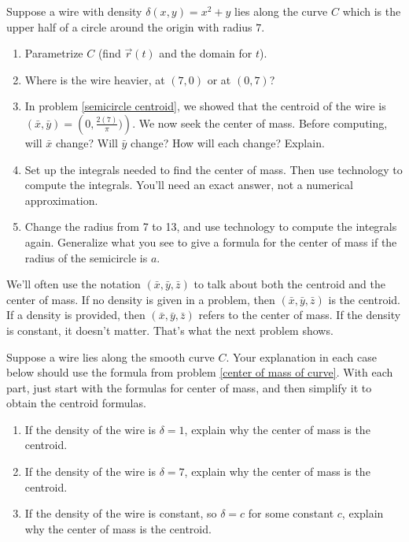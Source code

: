 \begin{problem}
%
Suppose a wire with density $\delta(x,y)=x^2+y$ lies along the curve $C$ which is the upper half of a circle around the origin with radius $7$.
\begin{enumerate}
\item Parametrize $C$ (find $\vec r(t)$ and the domain for $t$).
 \item Where is the wire heavier, at $(7,0)$ or at $(0,7)$?
 \item In problem \ref{semicircle centroid}, we showed that the centroid of the wire is $(\bar x, \bar y) = \left(0,\frac{2(7)}{\pi})\right)$.  We now seek the center of mass. Before computing, will $\bar x$ change?  Will $\bar y$ change?  How will each change? Explain.
 \item Set up the integrals needed to find the center of mass. Then use technology to compute the integrals. You'll need an exact answer, not a numerical approximation.
 \item Change the radius from 7 to 13, and use technology to compute the integrals again.  Generalize what you see to give a formula for the center of mass if the radius of the semicircle is $a$.
\end{enumerate}
\end{problem}

We'll often use the notation $(\bar x, \bar y,\bar z)$ to talk about both the centroid and the center of mass. If no density is given in a problem, then $(\bar x, \bar y,\bar z)$ is the centroid. If a density is provided, then $(\bar x, \bar y,\bar z)$ refers to the center of mass. If the density is constant, it doesn't matter. That's what the next problem shows.

\begin{problem}
 Suppose a wire lies along the smooth curve $C$. Your explanation in each case below should use the formula from problem \ref{center of mass of curve}. With each part, just start with the formulas for center of mass, and then simplify it to obtain the centroid formulas.
\begin{enumerate}
 \item If the density of the wire is $\delta =1$, explain why the center of mass is the centroid. 
 \item If the density of the wire is $\delta =7$, explain why the center of mass is the centroid.
 \item If the density of the wire is constant, so $\delta =c$ for some constant $c$, explain why the center of mass is the centroid.
\end{enumerate}
\end{problem}

